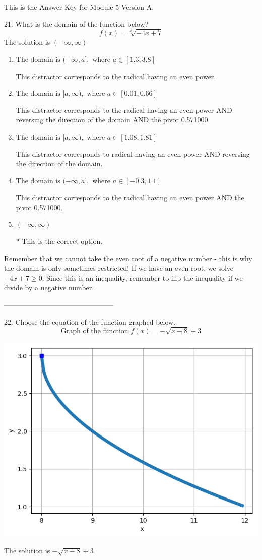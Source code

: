 \documentclass{article}[10pt]
\begin{document}
This is the Answer Key for Module 5 Version A.

21. What is the domain of the function below?
$$ f(x) = \sqrt[3]{-4 x + 7} $$ 
The solution is $ (-\infty, \infty) $ 

\begin{enumerate}[label=\Alph*.] 
\item $ \text{The domain is } (-\infty, a], \text{   where } a \in [1.3, 3.8] $ 

 This distractor corresponds to the radical having an even power. 
\item $ \text{The domain is } [a, \infty), \text{   where } a \in [0.01, 0.66] $ 

 This distractor corresponds to the radical having an even power AND reversing the direction of the domain AND the pivot 0.571000. 
\item $ \text{The domain is } [a, \infty), \text{   where } a \in [1.08, 1.81] $ 

 This distractor corresponds to radical having an even power AND reversing the direction of the domain. 
\item $ \text{The domain is } (-\infty, a], \text{   where } a \in [-0.3, 1.1] $ 

 This distractor corresponds to the radical having an even power AND the pivot 0.571000. 
\item $ (-\infty, \infty) $ 

 * This is the correct option. 
\end{enumerate} 
 
Remember that we cannot take the even root of a negative number - this is why the domain is only sometimes restricted! If we have an even root, we solve $-4 x + 7 \geq 0$. Since this is an inequality, remember to flip the inequality if we divide by a negative number.

-----------------------------------------------

22. Choose the equation of the function graphed below.
$$ \text{Graph of the function } f(x) = - \sqrt{x - 8} + 3 $$ 
\begin{center}\includegraphics[scale=0.5]{../Figures/question22A.png}\end{center}The solution is $ - \sqrt{x - 8} + 3 $ 
\end{document}
